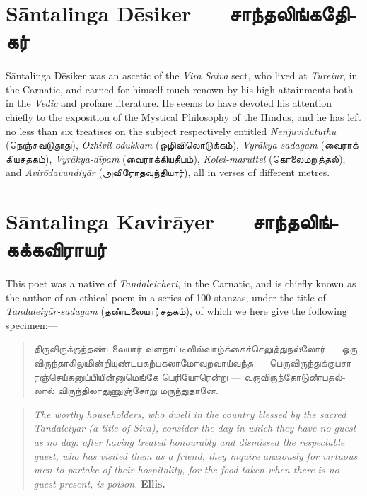 \documentclass{article}
\newcommand{\TamilText}[1]{\texttamil{#1}}
\newcommand{\TamilBold}[1]{\texttamil{\textbf{#1}}}
\newcommand{\tam}[1]{\TamilText{#1}}
\newcommand{\tambold}[1]{\TamilBold{#1}}
\begin{document}
\section{S\={a}ntalinga D\={e}siker --- \tambold{சாந்தலிங்கதேிகர்}}
\paragraph{}
S\={a}ntalinga D\={e}siker was an ascetic of the \emph{Vira Saiva} sect, who lived at \emph{Tureiur}, in the Carnatic, and earned for himself much renown by his high attainments both in the \emph{Vedic} and profane literature. He seems to have devoted his attention chiefly to the exposition of the Mystical Philosophy of the Hindus, and he has left no less than six treatises on the subject respectively entitled \emph{Nenjuvidut\={u}thu} (\tam{நெஞ்சுவடுதூது}), \emph{Ozhivil-odukkam} (\tam{ஒழிவிலொடுக்கம்}), \emph{Vyr\={a}kya-sadagam} (\tam{வைராக்கியசதகம்}), \emph{Vyr\={a}kya-d\={i}pam} (\tam{வைராக்கியதீபம்}), \emph{Kolei-maruttel} (\tam{கொலைமறுத்தல்}), and \emph{Avir\={o}davundiy\={a}r} (\tam{அவிரோதவுந்தியார்}), all in verses of different metres.

\section{S\={a}ntalinga Kavir\={a}yer --- \tambold{சாந்தலிங்கக்கவிராயர்}}
\paragraph{}
This poet was a native of \emph{Tandaleicheri}, in the Carnatic, and is chiefly known as the author of an ethical poem in a series of 100 stanzas, under the title of \emph{Tandaleiy\={a}r-sadagam} (\tam{தண்டலையார்சதகம்}), of which we here give the following specimen:---
\begin{quotation}\small
\tam{திருவிருக்குந்தண்டலையார்‌ வளநாட்டிலில்வாழ்க்கைச்செலுத்துநல்‌லோர்} --- \tam{ஒருவிருந்தாகிலுமின்றியுண்டபகற்பகலாமோவுறவாய்வந்த} --- \tam{பெருவிருந்துக்குபசாரஞ்செய்தனுப்‌பியின்னுமெங்கே பெரியோரென்று} --- \tam{வருவிருந்தோடுண்பதல்லால்‌ விருந்திலாதுணுஞ்சோறு மருந்துதானே}.
\end{quotation}
\begin{quotation}\small
\emph{The worthy householders, who dwell in the country blessed by the sacred Tandaleiyar (a title of Siva), consider the day in which they have no guest as no day: after having treated honourably and dismissed the respectable guest, who has visited them as a friend, they inquire anxiously for virtuous men to partake of their hospitality, for the food taken when there is no guest present, is poison.} \textbf{Ellis.}
\end{quotation}
\end{document}
